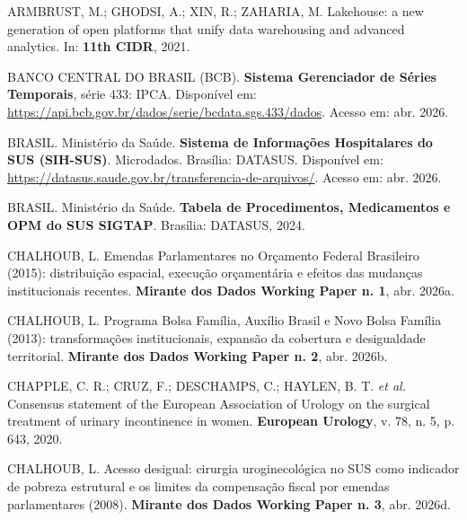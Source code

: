 \documentclass[12pt,a4paper,oneside]{article}
\begin{document}
\begin{singlespace}\small
\noindent\hangindent=1.25cm
ARMBRUST, M.; GHODSI, A.; XIN, R.; ZAHARIA, M. Lakehouse: a new
generation of open platforms that unify data warehousing and
advanced analytics. In: \textbf{11th CIDR}, 2021.\par\smallskip

\noindent\hangindent=1.25cm
BANCO CENTRAL DO BRASIL (BCB). \textbf{Sistema Gerenciador de
Séries Temporais}, série 433: IPCA. Disponível em:
\url{https://api.bcb.gov.br/dados/serie/bcdata.sgs.433/dados}.
Acesso em: abr. 2026.\par\smallskip

\noindent\hangindent=1.25cm
BRASIL. Ministério da Saúde. \textbf{Sistema de Informações
Hospitalares do SUS (SIH-SUS)}. Microdados. Brasília: DATASUS.
Disponível em:
\url{https://datasus.saude.gov.br/transferencia-de-arquivos/}.
Acesso em: abr. 2026.\par\smallskip

\noindent\hangindent=1.25cm
BRASIL. Ministério da Saúde. \textbf{Tabela de Procedimentos,
Medicamentos e OPM do SUS \textemdash{} SIGTAP}. Brasília:
DATASUS, 2024.\par\smallskip

\noindent\hangindent=1.25cm
CHALHOUB, L. Emendas Parlamentares no Orçamento Federal
Brasileiro (2015): distribuição espacial,
execução orçamentária e efeitos das mudanças institucionais
recentes. \textbf{Mirante dos Dados \textemdash{} Working Paper
n. 1}, abr. 2026a.\par\smallskip

\noindent\hangindent=1.25cm
CHALHOUB, L. Programa Bolsa Família, Auxílio Brasil e Novo
Bolsa Família (2013): transformações
institucionais, expansão da cobertura e desigualdade territorial.
\textbf{Mirante dos Dados \textemdash{} Working Paper n. 2},
abr. 2026b.\par\smallskip

\noindent\hangindent=1.25cm
CHAPPLE, C. R.; CRUZ, F.; DESCHAMPS, C.; HAYLEN, B. T.
\textit{et al.} Consensus statement of the European Association
of Urology on the surgical treatment of urinary incontinence in
women. \textbf{European Urology}, v. 78, n. 5,
p. 643, 2020.\par\smallskip

\noindent\hangindent=1.25cm
CHALHOUB, L. Acesso desigual: cirurgia uroginecológica no SUS
como indicador de pobreza estrutural e os limites da
compensação fiscal por emendas parlamentares
(2008). \textbf{Mirante dos Dados \textemdash{}
Working Paper n. 3}, abr. 2026d.\par\smallskip


\end{singlespace}
\end{document}
